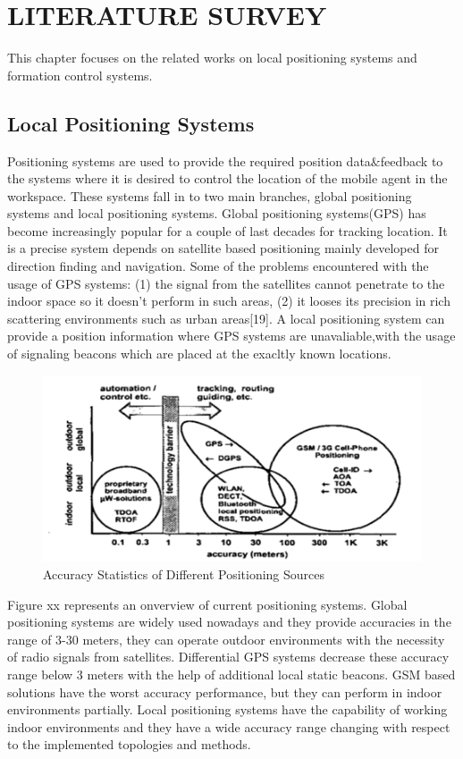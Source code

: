 

\chapter{LITERATURE SURVEY}
\label{chp:Literature Survey}

This chapter focuses on the related works on local positioning systems and formation control systems. 

\section{Local Positioning Systems}

Positioning systems are used to provide the required position data$\&$feedback to the systems where it is desired to control the location of the mobile agent in the workspace.
These systems fall in to two main branches, global positioning systems and local positioning systems. Global positioning systems(GPS) has become increasingly popular for a couple of last decades for tracking location. It is a precise system depends on satellite based positioning mainly developed for direction finding and navigation.  Some of the problems encountered with the usage of GPS systems: (1) the signal from the satellites cannot penetrate to the indoor space so it doesn't perform in such areas, (2) it looses its precision in rich scattering environments such as urban areas[19].  A local positioning system can provide a position information where GPS systems are unavaliable,with the usage of signaling beacons which are placed at the exacltly known locations.




\begin{figure}[H]
	\caption{Accuracy Statistics of Different Positioning Sources}
	\centering
	\includegraphics[scale = 1]{gps}
\end{figure} 

Figure xx represents an onverview of current positioning systems. Global positioning systems are widely used nowadays and they provide accuracies in the range of 3-30 meters, they can operate outdoor environments with the necessity of radio signals from satellites. Differential GPS systems decrease these accuracy range below 3 meters with the help of additional local static beacons. GSM based solutions have the worst accuracy performance, but they can perform in indoor environments partially.  Local positioning systems have the capability of working indoor environments and they have a wide accuracy range changing with respect to the implemented topologies and methods. 

